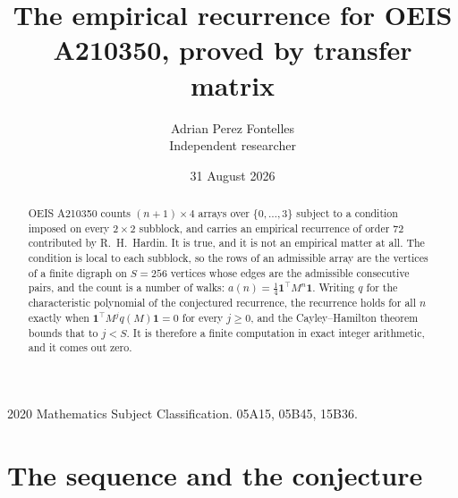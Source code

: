 \documentclass[11pt,a4paper]{article}
\title{The empirical recurrence for OEIS A210350, proved by transfer matrix}
\author{Adrian Perez Fontelles\\ \small Independent researcher}
\date{31 August 2026}
\theoremstyle{plain}
\theoremstyle{definition}
\begin{document}
\maketitle

\begin{abstract}
OEIS A210350 counts $(n+1)\times4$ arrays over $\{0,\dots,3\}$ subject to a condition imposed on
every $2\times2$ subblock, and carries an empirical recurrence of order $72$ contributed
by R.~H.~Hardin. It is true, and it is not an empirical matter at all. The condition is local
to each subblock, so the rows of an admissible array are the vertices of a finite digraph
on $S=256$ vertices whose edges are the admissible consecutive pairs, and the count is a
number of walks: $a(n)=\tfrac1{4}\mathbf{1}^{\!\top}M^{n}\mathbf{1}$. Writing $q$
for the characteristic polynomial of the conjectured recurrence, the recurrence holds for all
$n$ exactly when $\mathbf{1}^{\!\top}M^{j}q(M)\mathbf{1}=0$ for every $j\ge0$, and the
Cayley--Hamilton theorem bounds that to $j<S$. It is therefore a finite computation in exact
integer arithmetic, and it comes out zero.
\end{abstract}

\noindent\small 2020 Mathematics Subject Classification. 05A15, 05B45, 15B36.\normalsize

\section{The sequence and the conjecture}
\end{document}
